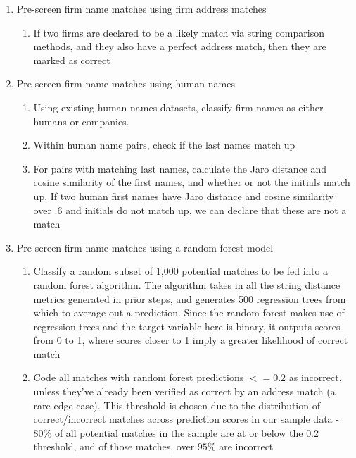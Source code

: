 \documentclass{article}
\begin{document}
\begin{enumerate}
    \item Pre-screen firm name matches using firm address matches
    \begin{enumerate}
    \item If two firms are declared to be a likely match via string comparison methods, and they also have a perfect address match, then they are marked as correct
    \end{enumerate}
    
    \item Pre-screen firm name matches using human names
    \begin{enumerate}
    \item Using existing human names datasets, classify firm names as either humans or companies. 
    \item Within human name pairs, check if the last names match up
    \item For pairs with matching last names, calculate the Jaro distance and cosine similarity of the first names, and whether or not the initials match up. If two human first names have Jaro distance and cosine similarity over $.6$ and initials do not match up, we can declare that these are not a match 
    \end{enumerate}
    
    \item Pre-screen firm name matches using a random forest model
    \begin{enumerate}
    \item Classify a random subset of 1,000 potential matches to be fed into a random forest algorithm. The algorithm takes in all the string distance metrics generated in prior steps, and generates 500 regression trees from which to average out a prediction. Since the random forest makes use of regression trees and the target variable here is binary, it outputs scores from 0 to 1, where scores closer to 1 imply a greater likelihood of correct match
    \item Code all matches with random forest predictions $<= 0.2$ as incorrect, unless they've already been verified as correct by an address match (a rare edge case). This threshold is chosen due to the distribution of correct/incorrect matches across prediction scores in our sample data - $80\%$ of all potential matches in the sample are at or below the $0.2$ threshold, and of those matches, over $95\%$ are incorrect
    
    \end{enumerate}
    

\end{enumerate}
\end{document}
